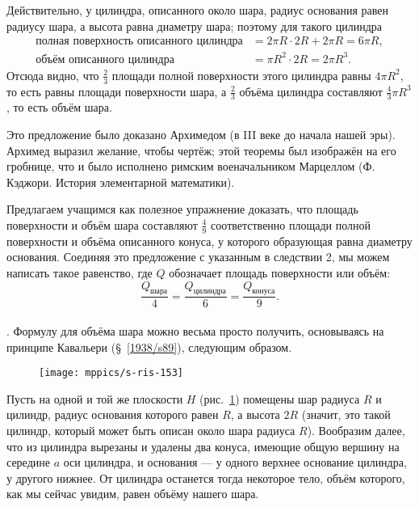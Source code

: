 Действительно, у цилиндра, описанного около шара, радиус основания равен радиусу шара, а высота равна диаметру шара;
поэтому для такого цилиндра
\begin{align*}
\text{полная поверхность описанного цилиндра} &= 2\pi R \cdot 2R + 2\pi R = 6\pi R,
\\
\text{объём описанного цилиндра} &= \pi R^2\cdot 2R = 2\pi R^3.
\end{align*}
Отсюда видно, что $\tfrac23$ площади полной поверхности этого цилиндра равны $4\pi R^2$, то есть равны площади поверхности шара, а $\tfrac23$ объёма цилиндра составляют $\tfrac43\pi R^3$, то есть объём шара.

Это предложение было доказано Архимедом (в III веке до начала нашей эры).
Архимед выразил желание, чтобы чертёж;
этой теоремы был изображён на его гробнице, что и было исполнено римским военачальником Марцеллом (Ф. Кэджори. История элементарной математики).

Предлагаем учащимся как полезное упражнение доказать, что площадь поверхности и объём шара составляют $\tfrac49$ соответственно площади полной поверхности и объёма описанного конуса, у которого образующая равна диаметру основания.
Соединяя это предложение с указанным в следствии 2, мы можем написать такое равенство, где $Q$ обозначает площадь поверхности или объём:
\[\frac{Q_{\text{шара}}}4
=\frac{Q_{\text{цилиндра}}}6
=\frac{Q_{\text{конуса}}}9.
\]

\paragraph{}\label{1938/s147}
.
Формулу для объёма шара можно весьма просто получить, основываясь на принципе Кавальери (§~\ref{1938/s89}), следующим образом.

\begin{figure}[h!]
\vskip-0mm
\centering
\texttt{[image: mppics/s-ris-153]}
\caption{}\label{1938/s-ris-153}
\vskip-0mm
\end{figure}

Пусть на одной и той же плоскости $H$ (рис.~\ref{1938/s-ris-153}) помещены шар радиуса $R$ и цилиндр, радиус основания которого равен $R$, а высота $2R$ (значит, это такой цилиндр, который может быть описан около шара радиуса $R$).
Вообразим далее, что из цилиндра вырезаны и удалены два конуса, имеющие общую вершину на середине $a$ оси цилиндра, и основания — у одного верхнее основание цилиндра, у другого нижнее.
От цилиндра останется тогда некоторое тело, объём которого, как мы сейчас увидим, равен объёму нашего шара.

